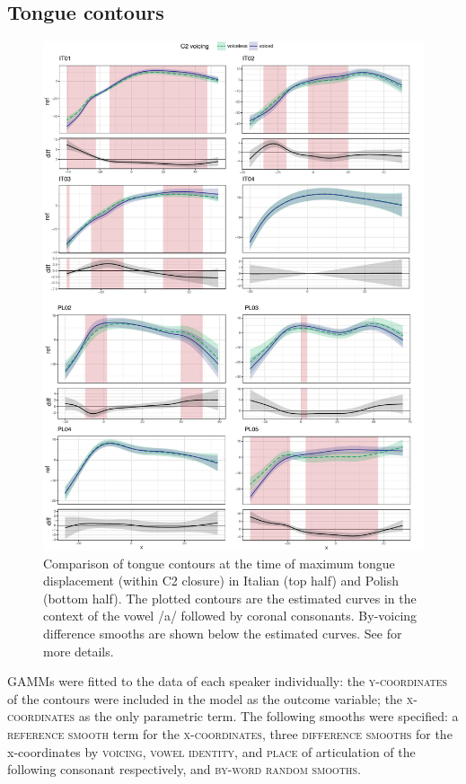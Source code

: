 \documentclass[authoryear, 5p]{elsarticle}
\begin{document}
\subsection{Tongue contours}\label{tongue-contours}

\label{s:splines}

\begin{figure}
    \centering
    \includegraphics[height=.9\textheight]{fig/tra-colour.pdf}
    \caption{Comparison of tongue contours at the time of maximum tongue displacement (within C2 closure) in Italian (top half) and Polish (bottom half). The plotted contours are the estimated curves in the context of the vowel /a/ followed by coronal consonants. By-voicing difference smooths are shown below the estimated curves. See  for more details.}
    \label{f:tra}
\end{figure}

GAMMs were fitted to the data of each speaker individually: the
\textsc{y-coordinates} of the contours were included in the model as the
outcome variable; the \textsc{x-coordinates} as the only parametric
term. The following smooths were specified: a \textsc{reference smooth}
term for the \textsc{x-coordinates}, three \textsc{difference smooths}
for the x-coordinates by \textsc{voicing}, \textsc{vowel identity}, and
\textsc{place} of articulation of the following consonant respectively,
and \textsc{by-word random smooths}.
\end{document}
